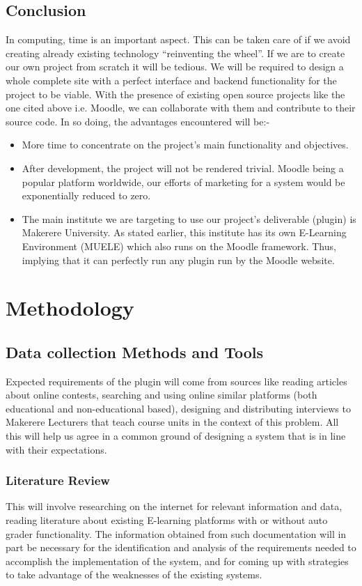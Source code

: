 \documentclass[12pt]{article}
\begin{document}
	\subsection{Conclusion}
	In computing, time is an important aspect. This can be taken care of if we avoid creating already existing technology 			“reinventing the wheel”. If we are to create our own project from scratch it will be tedious. We will be required to design a 		whole complete site with a perfect interface and backend functionality for the project to be viable. With the presence of 		existing open source projects like the one cited above i.e. Moodle, we can collaborate with them and contribute to their 			source code. In so doing, the advantages encountered will be:- 
	 \begin{itemize}
			\item More time to concentrate on the project’s main functionality and objectives.
			\item 	After development, the project will not be rendered trivial. Moodle being a popular platform 							worldwide, our efforts of marketing for a system would be exponentially reduced to zero.
			\item	The main institute we are targeting to use our project’s deliverable (plugin) is Makerere University. As 					stated earlier, this institute has its own E-Learning Environment (MUELE) which also runs on the 						Moodle framework. Thus, implying that it can perfectly run any plugin run by the Moodle website.
		\end{itemize}

\newpage

\section{Methodology}
	
	\subsection{Data collection Methods and Tools}
		Expected requirements of the plugin will come from sources like reading articles about online contests, searching and using online similar platforms (both educational and non-educational based), designing and distributing interviews to Makerere Lecturers that teach course units in the context of this problem. All this will help us agree in a common ground of designing a system that is in line with their expectations.
		\subsubsection{Literature Review}
			This will involve researching on the internet for relevant information and data, reading literature about existing E-learning platforms with or without auto grader functionality. The information obtained from such documentation will in part be necessary for the identification and analysis of the requirements needed to accomplish the implementation of the system, and for coming up with strategies to take advantage of the weaknesses of the existing systems.
\end{document}
